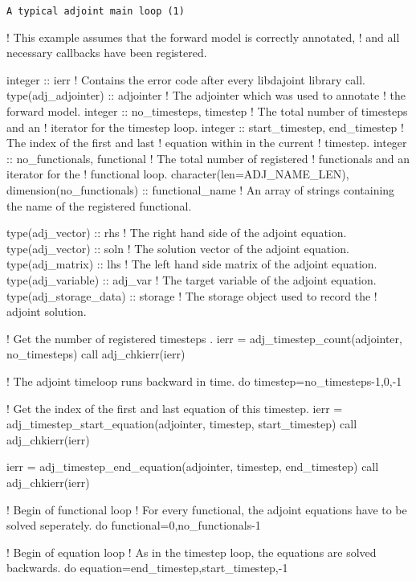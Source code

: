 \begin{boxwithtitle}{\texttt{A typical adjoint main loop (1)}}
\begin{minipage}{\columnwidth}
\begin{fortrancode}   
  ! This example assumes that the forward model is correctly annotated,
  ! and all necessary callbacks have been registered. 

  integer :: ierr ! Contains the error code after every libdajoint library call.
  type(adj_adjointer)  :: adjointer ! The adjointer which was used to annotate 
                                    ! the forward model.
  integer :: no_timesteps, timestep ! The total number of timesteps and an 
                                    ! iterator for the timestep loop.
  integer :: start_timestep, end_timestep ! The index of the first and last 
                                          ! equation within in the current 
                                          ! timestep. 
  integer :: no_functionals, functional ! The total number of registered 
                                        ! functionals and an iterator for the 
                                        ! functional loop.
  character(len=ADJ_NAME_LEN), dimension(no_functionals) :: functional_name 
        ! An array of strings containing the name of the registered functional.

  type(adj_vector) :: rhs ! The right hand side of the adjoint equation.
  type(adj_vector) :: soln ! The solution vector of the adjoint equation.
  type(adj_matrix) :: lhs ! The left hand side matrix of the adjoint equation.
  type(adj_variable) :: adj_var ! The target variable of the adjoint equation.
  type(adj_storage_data) :: storage ! The storage object used to record the 
                                    ! adjoint solution.

  ! Get the number of registered timesteps .
  ierr = adj_timestep_count(adjointer, no_timesteps)
  call adj_chkierr(ierr)

  ! The adjoint timeloop runs backward in time.
  do timestep=no_timesteps-1,0,-1

    ! Get the index of the first and last equation of this timestep.
    ierr = adj_timestep_start_equation(adjointer, timestep, start_timestep)
    call adj_chkierr(ierr)

    ierr = adj_timestep_end_equation(adjointer, timestep, end_timestep)
    call adj_chkierr(ierr)

    ! Begin of functional loop
    ! For every functional, the adjoint equations have to be solved seperately.
    do functional=0,no_functionals-1

      ! Begin of equation loop
      ! As in the timestep loop, the equations are solved backwards.
      do equation=end_timestep,start_timestep,-1
      
\end{fortrancode}
\end{minipage}
\end{boxwithtitle}

